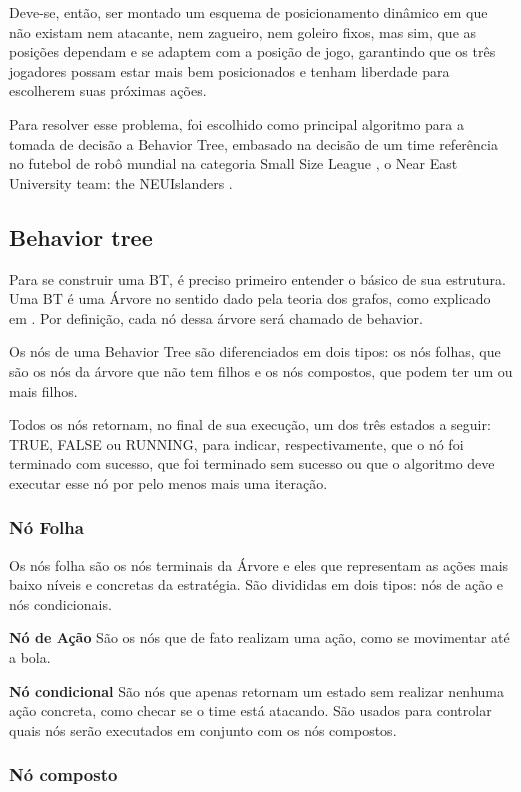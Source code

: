 \documentclass[a4paper,12pt]{article}
\begin{document}
Deve-se, então, ser montado um esquema de posicionamento dinâmico em que não existam nem atacante, nem zagueiro, nem goleiro fixos, mas sim, que as posições dependam e se adaptem com a posição de jogo, garantindo que os três jogadores possam estar mais bem posicionados e tenham liberdade para escolherem suas próximas ações.

Para resolver esse problema, foi escolhido como principal algoritmo para a tomada de decisão a Behavior Tree, embasado na decisão de um time referência no futebol de robô mundial na categoria Small Size League \cite{ssl}, o Near East University team: the NEUIslanders \cite{NEUIslanders_ssl}.


\subsection{Behavior tree}

Para se construir uma BT, é preciso primeiro entender o básico de sua estrutura. Uma BT é uma Árvore no sentido dado pela teoria dos grafos, como explicado em \cite{west2001introduction}. Por definição, cada nó dessa árvore será chamado de behavior.

Os nós de uma Behavior Tree são diferenciados em dois tipos: os nós folhas, que são os nós da árvore que não tem filhos e os nós compostos, que podem ter um ou mais filhos.

Todos os nós retornam, no final de sua execução, um dos três estados a seguir: TRUE, FALSE ou RUNNING, para indicar, respectivamente, que o nó foi terminado com sucesso, que foi terminado sem sucesso ou que o algoritmo deve executar esse nó por pelo menos mais uma iteração.

\subsubsection{Nó Folha}

Os nós folha são os nós terminais da Árvore e eles que representam as ações mais baixo níveis e concretas da estratégia. São divididas em dois tipos: nós de ação e nós condicionais.

\textbf{Nó de Ação} São os nós que de fato realizam uma ação, como se movimentar até a bola.

\textbf{Nó condicional} São nós que apenas retornam um estado sem realizar nenhuma ação concreta, como checar se o time está atacando. São usados para controlar quais nós serão executados em conjunto com os nós compostos.

\subsubsection{Nó composto}
\end{document}
